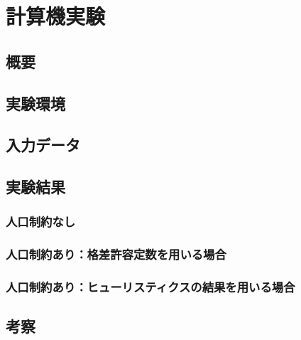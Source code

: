 \chapter{計算機実験} \label{chapter:5}

\section{概要}

\section{実験環境}

\section{入力データ}

\section{実験結果}

\subsection{人口制約なし}

\subsection{人口制約あり：格差許容定数を用いる場合}

\subsection{人口制約あり：ヒューリスティクスの結果を用いる場合}

\section{考察}